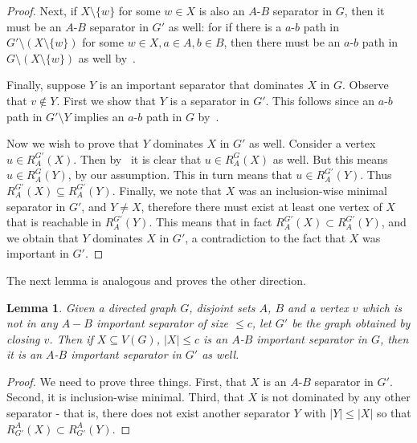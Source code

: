 \documentclass[11pt]{article}
\newtheorem{lemma}[theorem]{Lemma}
\begin{document}
{\begin{proof}
Next, if $X \setminus \{w\}$ for some $w \in X$ is also an $A$-$B$ separator in $G$, then it must be an $A$-$B$ separator in $G'$ as well: for if there is a $a$-$b$ path in $G' \setminus (X \setminus\{w\})$ for some $w \in X,a  \in A, b \in B$, then there must be an $a$-$b$ path in $G \setminus (X \setminus \{w\})$ as well by~.

Finally, suppose $Y$ is an important separator that dominates $X$ in $G$. Observe that $v \notin Y$. First we show that $Y$ is a separator in $G'$. This follows since an $a$-$b$ path in $G' \setminus Y$ implies an $a$-$b$ path in $G$ by~.

Now we wish to prove that $Y$ dominates $X$ in $G'$ as well. Consider a vertex $u \in R^{G'}_A(X)$. Then by~ it is clear that $u \in R^G_A(X)$ as well. But this means $u \in R^G_A(Y)$, by our assumption. This in turn means that $u \in R^{G'}_A(Y)$. Thus $R^{G'}_A(X) \subseteq R^{G'}_A(Y)$. Finally, we note that $X$ was an inclusion-wise minimal separator in $G'$, and $Y \neq X$, therefore there must exist at least one vertex of $X$ that is reachable in $R^{G'}_A(Y)$. This means that in fact $R^{G'}_A(X) \subset R^{G'}_A(Y)$, and we obtain that $Y$ dominates $X$ in $G'$, a contradiction to the fact that $X$ was important in $G'$.
\end{proof}










The next lemma is analogous and proves the other direction.

\begin{lemma}\label{lemma:mimicking2}
Given a directed graph $G$, disjoint sets $A$, $B$ and a vertex $v$ which is not in any $A-B$ important separator of size $\leq c$, let $G'$ be the graph obtained by closing $v$. Then if $X \subseteq V(G)$, $|X| \leq c$ is an $A$-$B$ important separator in $G$, then it is an $A$-$B$ important separator in $G'$ as well.
\end{lemma}

\begin{proof}

We need to prove three things. First, that $X$ is an $A$-$B$ separator in $G'$. Second, it is inclusion-wise minimal. Third, that $X$ is not dominated by any other separator - that is, there does not exist another separator $Y$ with $|Y| \leq |X|$ so that $R_{G'}^A(X) \subset R_{G'}^A(Y)$.


\end{proof}}
\end{document}

